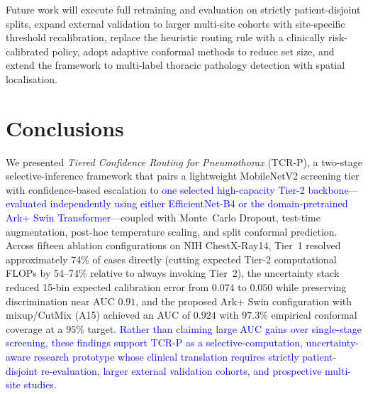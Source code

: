 \documentclass[diagnostics,article,submit,moreauthors]{Definitions/mdpi}
\newcommand{\rev}[1]{\textcolor{blue}{#1}}
\begin{document}
Future work will execute full retraining and evaluation on strictly patient-disjoint splits, expand external validation to larger multi-site cohorts with site-specific threshold recalibration, replace the heuristic routing rule with a clinically risk-calibrated policy, adopt adaptive conformal methods to reduce set size, and extend the framework to multi-label thoracic pathology detection with spatial localisation.

\section{Conclusions}
\label{sec:conclusion}

We presented \emph{Tiered Confidence Routing for Pneumothorax} (TCR-P), a two-stage selective-inference framework that pairs a lightweight MobileNetV2 screening tier with confidence-based escalation to \rev{one selected high-capacity Tier-2 backbone---evaluated independently using either EfficientNet-B4 or the domain-pretrained Ark+ Swin Transformer---}coupled with Monte~Carlo Dropout, test-time augmentation, post-hoc temperature scaling, and split conformal prediction. Across fifteen ablation configurations on NIH ChestX-Ray14, Tier~1 resolved approximately 74\% of cases directly (cutting expected Tier-2 computational FLOPs by 54--74\% relative to always invoking Tier~2), the uncertainty stack reduced 15-bin expected calibration error from $0.074$ to $0.050$ while preserving discrimination near AUC $0.91$, and the proposed Ark+ Swin configuration with mixup/CutMix (A15) achieved an AUC of $0.924$ with $97.3\%$ empirical conformal coverage at a $95\%$ target. \rev{Rather than claiming large AUC gains over single-stage screening, these findings support TCR-P as a selective-computation, uncertainty-aware research prototype whose clinical translation requires strictly patient-disjoint re-evaluation, larger external validation cohorts, and prospective multi-site studies.}

\vspace{6pt}

\end{document}
